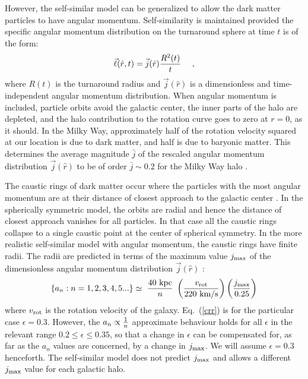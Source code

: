 \documentclass[aps,prd,preprint,tightenlines,floatfix,showpacs,groupedaddress]{revtex4}
\begin{document}
However, the self-similar model can be generalized \cite{STW} to allow 
the dark matter particles to have angular momentum.  Self-similarity is 
maintained provided the specific angular momentum distribution on the 
turnaround sphere at time $t$ is of the form:
\begin{equation}
\vec{\ell}(\hat{r},t) = \vec{j}(\hat{r}) {R^2(t) \over t}~~~\ ,
\label{am}
\end{equation}
where $R(t)$ is the turnaround radius and $\vec{j}(\hat{r})$ is a 
dimensionless and time-independent angular momentum distribution.  
When angular momentum is included, particle orbits avoid the galactic
center, the inner parts of the halo are depleted, and the halo 
contribution to the rotation curve goes to zero at $r = 0$, as 
it should.  In the Milky Way, approximately half of the rotation 
velocity squared at our location is due to dark matter, and half 
is due to baryonic matter.  This determines the average magnitude 
$\bar{j}$ of the rescaled angular momentum distribution 
$\vec{j}(\hat{r})$ to be of order $\bar{j} \sim 0.2$ for the Milky 
Way halo \cite{STW}.

The caustic rings of dark matter occur where the particles with 
the most angular momentum are at their distance of closest approach 
to the galactic center \cite{sing,inn}.  In the spherically
symmetric model, the orbits are radial and hence the distance of 
closest approach vanishes for all particles.  In that case all the 
caustic rings collapse to a single caustic point at the center of 
spherical symmetry.  In the more realistic self-similar model with 
angular momentum, the caustic rings have finite radii.  The radii 
are predicted in terms of the maximum value $j_{\rm max}$ of the 
dimensionless angular momentum distribution $\vec{j}(\hat{r})$
\cite{cr}:
\begin{equation}
\{a_n : n = 1, 2, 3, 4, 5 ...\} \simeq ~{40~{\rm kpc} \over n}~ 
\left({v_{\rm rot} \over 220~{\rm km/s}}\right)
\left({j_{\rm max} \over 0.25}\right)
\label{crr}
\end{equation}
where $v_{\rm rot}$ is the rotation velocity of the galaxy.  
Eq.~(\ref{crr}) is for the particular case $\epsilon = 0.3$. 
However, the $a_n \propto {1 \over n}$ approximate behaviour 
holds for all $\epsilon$ in the relevant range 
$0.2 \leq \epsilon \leq 0.35$, so that a change in $\epsilon$ 
can be compensated for, as far as the $a_n$ values are concerned, by 
a change in $j_{\rm max}$.  We will assume $\epsilon = 0.3$ henceforth.  
The self-similar model does not predict $j_{\rm max}$ and allows
a different $j_{\rm max}$ value for each galactic halo.
\end{document}
